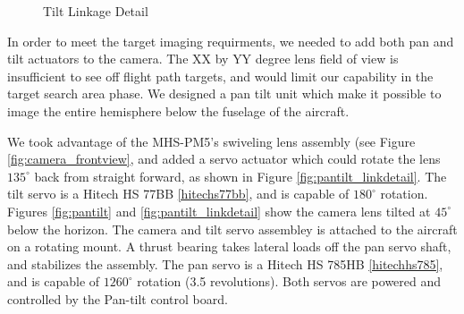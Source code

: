 \documentclass[10pt]{report}
\newcommand{\degrees}[1]
{
\begin{math}
#1^{\circ} 
\end{math}
}
\begin{document}
\begin{figure}
	\caption{Tilt Linkage Detail}
	\label{fig:pantilt_link}
\end{figure}

In order to meet the target imaging requirments, we needed to add both pan and tilt actuators to the camera. The XX by YY degree lens field of view is insufficient to see off flight path targets, and would limit our capability in the target search area phase. 
We designed a pan tilt unit which make it possible to image the entire hemisphere below the fuselage of the aircraft.

We took advantage of the MHS-PM5's swiveling lens assembly 
(see Figure \ref{fig:camera_frontview}, and added a servo actuator which could rotate the lens \degrees{135} back from straight forward, as shown in Figure \ref{fig:pantilt_linkdetail}. The tilt servo is a Hitech HS 77BB \ref{hitechs77bb}, and is capable of \degrees{180} rotation. Figures \ref{fig:pantilt} and \ref{fig:pantilt_linkdetail} show the camera lens tilted at \degrees{45} below the horizon.
The camera and tilt servo assembley is attached to the aircraft on a rotating mount. A thrust bearing takes lateral loads off the pan servo shaft, and stabilizes the assembly. The pan servo is a Hitech HS 785HB \ref{hitechhs785}, and is capable of \degrees{1260} rotation (3.5 revolutions). Both servos are powered and controlled by the Pan-tilt control board.
\end{document}

